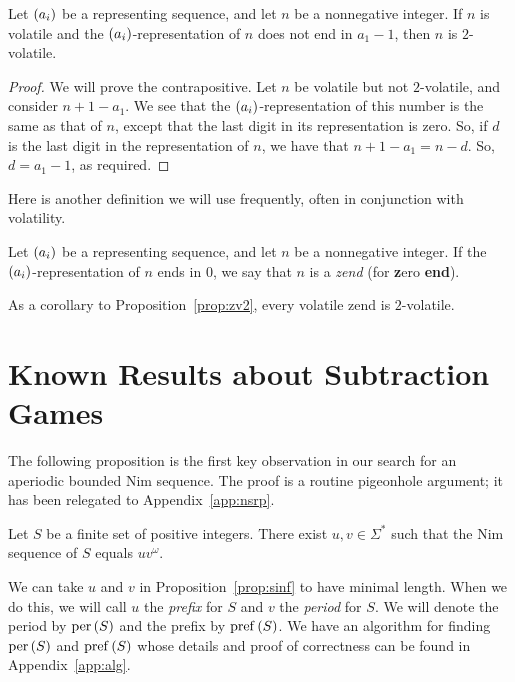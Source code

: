 \documentclass[english,12pt]{article}
\newcommand{\seq}{\p}
\DeclareMathOperator{\per}{per}
\DeclareMathOperator{\pref}{pref}
\begin{document}
\begin{prop}\label{prop:zv2}
Let $\seq{a_i}$ be a representing sequence, and let $n$ be a nonnegative integer.  If $n$ is volatile and the $\seq{a_i}$-representation of $n$ does not end in $a_1-1$, then $n$ is $2$-volatile.
\end{prop}
\begin{proof}
We will prove the contrapositive.  Let $n$ be volatile but not $2$-volatile, and consider $n+1-a_1$.  We see that the $\seq{a_i}$-representation of this number is the same as that of $n$, except that the last digit in its representation is zero.  So, if $d$ is the last digit in the representation of $n$, we have that $n+1-a_1=n-d$.  So, $d=a_1-1$, as required.
\end{proof}
Here is another definition we will use frequently, often in conjunction with volatility.
\begin{defin}
Let $\seq{a_i}$ be a representing sequence, and let $n$ be a nonnegative integer.  If the $\seq{a_i}$-representation of $n$ ends in $0$, we say that $n$ is a \emph{zend} (for \textbf{z}ero \textbf{end}).
\end{defin}
As a corollary to Proposition~\ref{prop:zv2}, every volatile zend is $2$-volatile.

\section{Known Results about Subtraction Games}\label{s:known}
The following proposition is the first key observation in our search for an aperiodic bounded Nim sequence.  The proof is a routine pigeonhole argument; it has been relegated to Appendix~\ref{app:nsrp}.
\begin{prop}\label{prop:sinf}
Let $S$ be a finite set of positive integers.  There exist $u,v\in\Sigma^*$ such that the Nim sequence of $S$ equals $uv^\omega$.
\end{prop}
We can take $u$ and $v$ in Proposition~\ref{prop:sinf} to have minimal length.  When we do this, we will call $u$ the \emph{prefix} for $S$ and $v$ the \emph{period} for $S$.  We will denote the period by $\per\p{S}$ and the prefix by $\pref\p{S}$.  We have an algorithm for finding $\per\p{S}$ and $\pref\p{S}$ whose details and proof of correctness can be found in Appendix~\ref{app:alg}.
\end{document}
